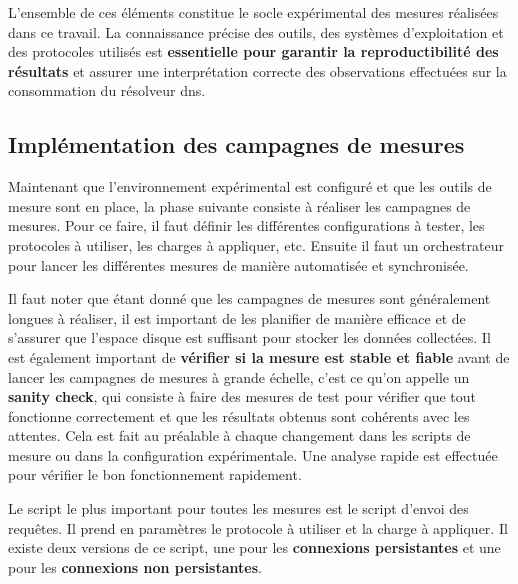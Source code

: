 \documentclass[12pt, a4paper]{report}
\begin{document}
	L'ensemble de ces éléments constitue le socle expérimental des mesures réalisées dans ce travail. La connaissance précise des outils, des systèmes d'exploitation et des protocoles utilisés est \textbf{essentielle pour garantir la reproductibilité des résultats} et assurer une interprétation correcte des observations effectuées sur la consommation du résolveur \gls{dns}.

	\subsection{Implémentation des campagnes de mesures}

	Maintenant que l'environnement expérimental est configuré et que les outils de mesure sont en place, la phase suivante consiste à réaliser les campagnes de mesures. Pour ce faire, il faut définir les différentes configurations à tester, les protocoles à utiliser, les charges à appliquer, etc. Ensuite il faut un orchestrateur pour lancer les différentes mesures de manière automatisée et synchronisée.

	Il faut noter que étant donné que les campagnes de mesures sont généralement longues à réaliser, il est important de les planifier de manière efficace et de s'assurer que l'espace disque est suffisant pour stocker les données collectées. Il est également important de \textbf{vérifier si la mesure est stable et fiable} avant de lancer les campagnes de mesures à grande échelle, c'est ce qu'on appelle un \textbf{sanity check}, qui consiste à faire des mesures de test pour vérifier que tout fonctionne correctement et que les résultats obtenus sont cohérents avec les attentes. Cela est fait au préalable à chaque changement dans les scripts de mesure ou dans la configuration expérimentale. Une analyse rapide est effectuée pour vérifier le bon fonctionnement rapidement.

	Le script le plus important pour toutes les mesures est le script d'envoi des requêtes. Il prend en paramètres le protocole à utiliser et la charge à appliquer. Il existe deux versions de ce script, une pour les \textbf{connexions persistantes} et une pour les \textbf{connexions non persistantes}.
	
\end{document}
